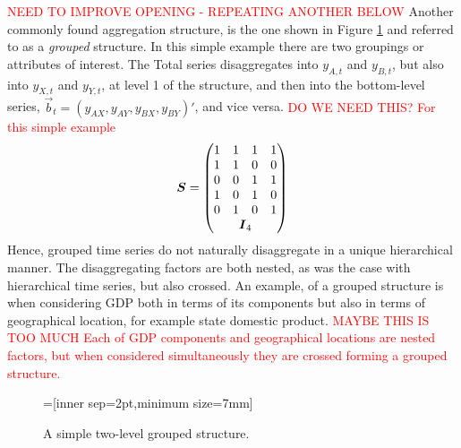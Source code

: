 \documentclass[graybox]{svmult}
\begin{document}
\textcolor{red}{NEED TO IMPROVE OPENING - REPEATING ANOTHER BELOW} Another commonly found aggregation structure, is the one shown in Figure \ref{fig:simple grouped tree} and referred to as a \textit{grouped} structure. In this simple example there are two groupings or attributes of interest. The Total series disaggregates into $y_{A,t}$ and $y_{B,t}$, but also into $y_{X,t}$ and $y_{Y,t}$, at level 1 of the structure, and then into the bottom-level series, $\vec{b}_t=(y_{AX}, y_{AY}, y_{BX}, y_{BY})'$, and vice versa. \textcolor{red}{DO WE NEED THIS? For this simple example
\begin{equation*}
\vec{S} = \begin{pmatrix}
1& 1& 1& 1 \\
1& 1& 0& 0 \\
0& 0& 1& 1 \\
1& 0& 1& 0 \\
0& 1& 0& 1 \\
& \multicolumn{2}{c}{\vec{I}_4} &
\end{pmatrix}
\end{equation*}}
Hence, grouped time series do not naturally disaggregate in a unique hierarchical manner. The disaggregating factors are both nested, as was the case with hierarchical time series, but also crossed. An example, of a grouped structure is when considering GDP both in terms of its components but also in terms of geographical location, for example state domestic product. \textcolor{red}{MAYBE THIS IS TOO MUCH Each of GDP components and geographical locations are nested factors, but when considered simultaneously they are crossed forming a grouped structure.}

\begin{figure}[!hbt]
\center
{}=[inner sep=2pt,minimum size=7mm]
  \caption{A simple two-level grouped structure.}
  \label{fig:simple grouped tree}
\end{figure}
\end{document}
